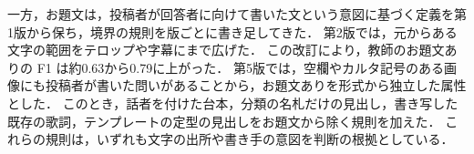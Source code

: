 一方，お題文は，投稿者が回答者に向けて書いた文という意図に基づく定義を第1版から保ち，境界の規則を版ごとに書き足してきた．
第2版では，元からある文字の範囲をテロップや字幕にまで広げた．
この改訂により，教師のお題文ありの F1 は約0.63から0.79に上がった．
第5版では，空欄やカルタ記号のある画像にも投稿者が書いた問いがあることから，お題文ありを形式から独立した属性とした．
このとき，話者を付けた台本，分類の名札だけの見出し，書き写した既存の歌詞，テンプレートの定型の見出しをお題文から除く規則を加えた．
これらの規則は，いずれも文字の出所や書き手の意図を判断の根拠としている．
